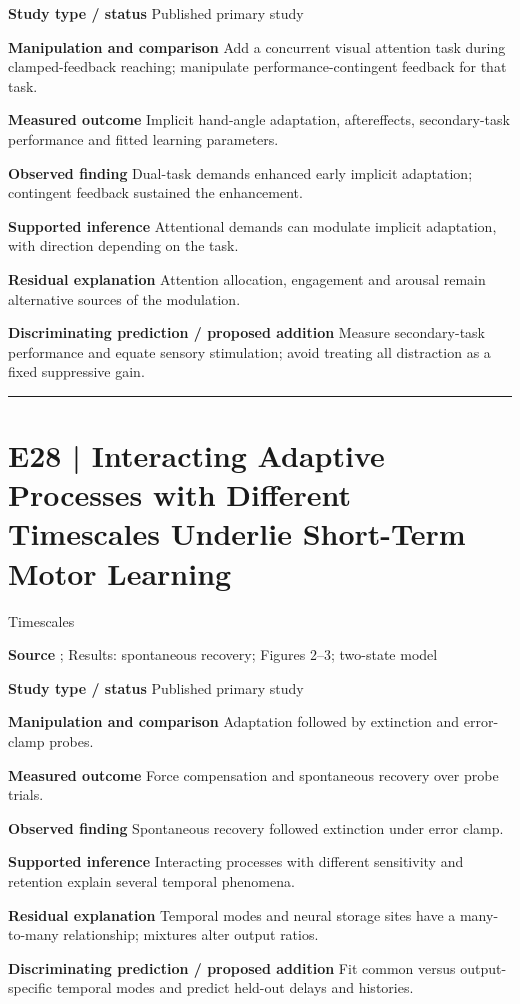 \documentclass[11pt,a4paper]{article}
\begin{document}
\textbf{Study type / status} Published primary study\par
\textbf{Manipulation and comparison} Add a concurrent visual attention task during clamped-feedback reaching; manipulate performance-contingent feedback for that task.\par
\textbf{Measured outcome} Implicit hand-angle adaptation, aftereffects, secondary-task performance and fitted learning parameters.\par
\textbf{Observed finding} Dual-task demands enhanced early implicit adaptation; contingent feedback sustained the enhancement.\par
\textbf{Supported inference} Attentional demands can modulate implicit adaptation, with direction depending on the task.\par
\textbf{Residual explanation} Attention allocation, engagement and arousal remain alternative sources of the modulation.\par
\textbf{Discriminating prediction / proposed addition} Measure secondary-task performance and equate sensory stimulation; avoid treating all distraction as a fixed suppressive gain.\par
\bigskip\hrule\medskip\section{E28 | Interacting Adaptive Processes with Different Timescales Underlie Short-Term Motor Learning}
{\small\sffamily\color{navy} Timescales}\par
\textbf{Source} \cite{smith2006}; Results: spontaneous recovery; Figures 2--3; two-state model\par
\textbf{Study type / status} Published primary study\par
\textbf{Manipulation and comparison} Adaptation followed by extinction and error-clamp probes.\par
\textbf{Measured outcome} Force compensation and spontaneous recovery over probe trials.\par
\textbf{Observed finding} Spontaneous recovery followed extinction under error clamp.\par
\textbf{Supported inference} Interacting processes with different sensitivity and retention explain several temporal phenomena.\par
\textbf{Residual explanation} Temporal modes and neural storage sites have a many-to-many relationship; mixtures alter output ratios.\par
\textbf{Discriminating prediction / proposed addition} Fit common versus output-specific temporal modes and predict held-out delays and histories.\par
\end{document}
